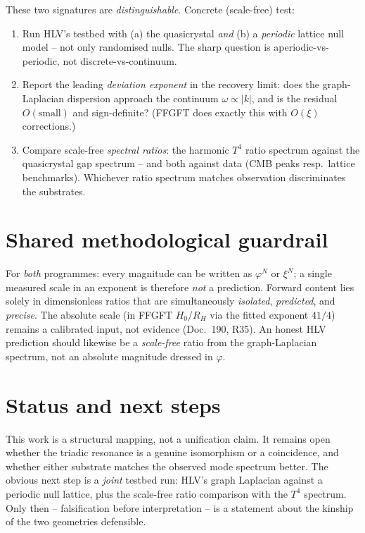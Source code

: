 These two signatures are \emph{distinguishable}. Concrete (scale-free) test:
\begin{enumerate}
\item Run HLV's testbed with (a) the quasicrystal \emph{and} (b) a \emph{periodic} lattice null model --
not only randomised nulls. The sharp question is aperiodic-vs-periodic, not discrete-vs-continuum.
\item Report the leading \emph{deviation exponent} in the recovery limit: does the graph-Laplacian
dispersion approach the continuum $\omega\propto|k|$, and is the residual $O(\text{small})$ and
sign-definite? (FFGFT does exactly this with $O(\xi)$ corrections.)
\item Compare scale-free \emph{spectral ratios}: the harmonic $T^4$ ratio spectrum against the
quasicrystal gap spectrum -- and both against data (CMB peaks resp.\ lattice benchmarks). Whichever
ratio spectrum matches observation discriminates the substrates.
\end{enumerate}

\section{Shared methodological guardrail}

For \emph{both} programmes: every magnitude can be written as $\varphi^{N}$ or $\xi^{N}$; a single
measured scale in an exponent is therefore \emph{not} a prediction. Forward content lies solely in
dimensionless ratios that are simultaneously \emph{isolated}, \emph{predicted}, and \emph{precise}. The
absolute scale (in FFGFT $H_0$/$R_H$ via the fitted exponent $41/4$) remains a calibrated input, not
evidence (Doc.~190, R35). An honest HLV prediction should likewise be a \emph{scale-free} ratio from
the graph-Laplacian spectrum, not an absolute magnitude dressed in $\varphi$.

\section{Status and next steps}

This work is a structural mapping, not a unification claim. It remains open whether the triadic
resonance is a genuine isomorphism or a coincidence, and whether either substrate matches the
observed mode spectrum better. The obvious next step is a \emph{joint} testbed run: HLV's graph
Laplacian against a periodic null lattice, plus the scale-free ratio comparison with the $T^4$
spectrum. Only then -- falsification before interpretation -- is a statement about the kinship of the
two geometries defensible.

